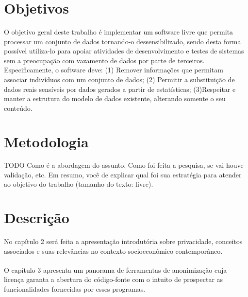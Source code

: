 \section{Objetivos}

\paragraph{} O objetivo geral deste trabalho é implementar um software livre que permita processar um conjunto de dados tornando-o dessensibilizado, sendo desta forma possível utiliza-lo para apoiar atividades de desenvolvimento e testes de sistemas sem a preocupação com vazamento de dados por parte de terceiros.
Especificamente, o software deve: (1) Remover informações que permitam associar indivíduos com um conjunto de dados; (2) Permitir a substituição de dados reais sensíveis por dados gerados a partir de estatísticas; (3)Respeitar e manter a estrutura do modelo de dados existente, alterando somente o seu conteúdo.


\section{Metodologia}

\paragraph{} TODO Como é a abordagem do assunto. Como foi feita a pesquisa, se vai houve validação, etc. Em resumo, você de explicar qual foi sua estratégia para atender ao objetivo do trabalho (tamanho do texto: livre).


\section{Descrição}

\paragraph{}No capítulo 2 será feita a apresentação introdutória sobre privacidade, conceitos associados e suas relevâncias no contexto socioeconômico contemporâneo.

\paragraph{}O capítulo 3 apresenta um panorama de ferramentas de anonimização cuja licença garanta a abertura do código-fonte com o intuito de prospectar as funcionalidades fornecidas por esses programas.
